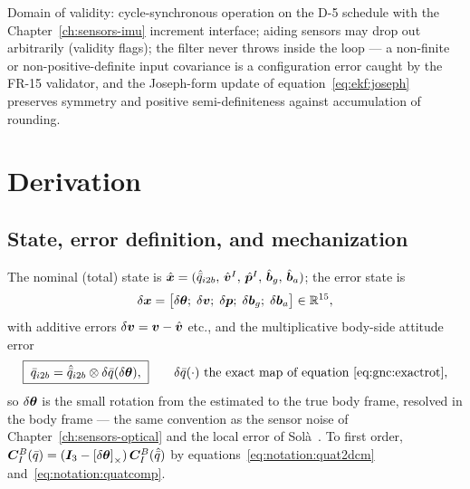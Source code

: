 Domain of validity: cycle-synchronous operation on the D-5 schedule
with the Chapter~\ref{ch:sensors-imu} increment interface; aiding
sensors may drop out arbitrarily (validity flags); the filter never
throws inside the loop --- a non-finite or non-positive-definite input
covariance is a configuration error caught by the FR-15 validator, and
the Joseph-form update of equation~\eqref{eq:ekf:joseph} preserves
symmetry and positive semi-definiteness against accumulation of
rounding.

\section{Derivation}
\label{sec:ekf:derivation}

\subsection{State, error definition, and mechanization}
\label{sec:ekf:mechanization}

The nominal (total) state is
$\hat{\bm{x}} = (\hat{\bar{q}}_{i2b},\, \hat{\bm{v}}^{I},\,
\hat{\bm{p}}^{I},\, \hat{\bm{b}}_g,\, \hat{\bm{b}}_a)$; the error state
is
\begin{equation}
  \delta\bm{x} = \bigl[\delta\bm{\theta};\; \delta\bm{v};\;
    \delta\bm{p};\; \delta\bm{b}_g;\; \delta\bm{b}_a\bigr]
    \in \mathbb{R}^{15},
  \label{eq:ekf:staterr}
\end{equation}
with additive errors $\delta\bm{v} = \bm{v} - \hat{\bm{v}}$ etc., and
the multiplicative body-side attitude error
\begin{equation}
  \boxed{\;
  \bar{q}_{i2b} = \hat{\bar{q}}_{i2b} \otimes
    \delta\bar{q}(\delta\bm{\theta}),
  \;}
  \qquad
  \delta\bar{q}(\cdot) \text{ the exact map of
    equation~\eqref{eq:gnc:exactrot}},
  \label{eq:ekf:qerr}
\end{equation}
so $\delta\bm{\theta}$ is the small rotation from the estimated to the
true body frame, resolved in the body frame --- the same convention as
the sensor noise of Chapter~\ref{ch:sensors-optical} and the local
error of Sol\`a~\cite{sola2017}. To first order,
$\bm{C}_{I}^{B}(\bar{q}) = (\bm{I}_3 -
\left[\delta\bm{\theta}\right]_{\times})\,\bm{C}_{I}^{B}(\hat{\bar{q}})$ by
equations~\eqref{eq:notation:quat2dcm}
and~\eqref{eq:notation:quatcomp}.

